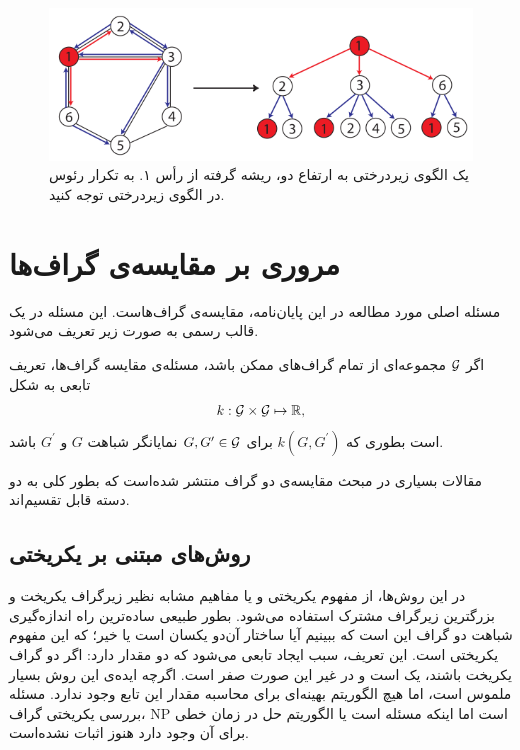 \begin{figure}[ht]
\centering
\includegraphics[scale=0.5]{./subtree-pattern.png}
\caption{یک الگوی زیردرختی به ارتفاع دو، ریشه گرفته از رأس ۱. به تکرار رئوس در الگوی زیردرختی توجه کنید.}
\label{fig:subtree-pattern}
\end{figure}

\section{مروری بر مقایسه‌ی گراف‌ها}\label{sec:graph_comparison}
مسئله اصلی مورد مطالعه در این پایان‌نامه، مقایسه‌ی گراف‌هاست. این مسئله در یک قالب رسمی به صورت زیر تعریف می‌شود.

\begin{definition}
اگر $\mathcal{G}$ مجموعه‌ای از تمام گراف‌های ممکن باشد، مسئله‌ی مقایسه گراف‌ها، تعریف تابعی به شکل
\begin{equation*}
k:\mathcal{G} \times \mathcal{G} \mapsto \mathbb{R},
\end{equation*}
است بطوری که $k(G,G^\prime)$ برای $G,G^\prime \in \mathcal{G}$ نمایانگر شباهت $G$ و $G^\prime$ باشد.
\end{definition}
مقالات بسیاری در مبحث مقایسه‌ی دو گراف منتشر شده‌است که بطور کلی به دو دسته قابل تقسیم‌اند.

\subsection{روش‌های مبتنی بر یکریختی}
در این روش‌ها، از مفهوم یکریختی و یا مفاهیم مشابه نظیر زیرگراف یکریخت و بزرگترین زیرگراف مشترک استفاده می‌شود. بطور طبیعی ساده‌ترین راه اندازه‌گیری شباهت دو گراف این است که ببینیم آیا ساختار آن‌دو یکسان است یا خیر؛ که این مفهوم یکریختی است. این تعریف، سبب ایجاد تابعی می‌شود که دو مقدار دارد: اگر دو گراف یکریخت باشند، یک است و در غیر این صورت صفر است. اگرچه ایده‌ی این روش بسیار ملموس است، اما هیچ الگوریتم بهینه‌ای برای محاسبه مقدار این تابع وجود ندارد. مسئله بررسی یکریختی گراف، NP‌ است اما اینکه مسئله  است یا الگوریتم حل در زمان خطی برای آن وجود دارد هنوز اثبات نشده‌است.

